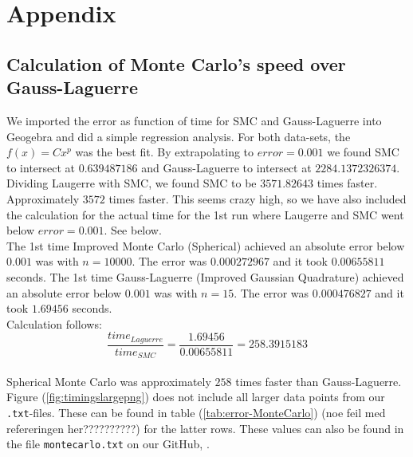 \documentclass{article}
\begin{document}
\section{Appendix} \label{sec:Appendix}

\subsection{Calculation of Monte Carlo's speed over Gauss-Laguerre}
We imported the error as function of time for SMC and Gauss-Laguerre into Geogebra and did a simple regression analysis. For both data-sets, the $f(x)=Cx^p$ was the best fit. By extrapolating to $error=0.001$ we found SMC to intersect at $0.639487186$ and Gauss-Laguerre to intersect at $2284.1372326374$. Dividing Laugerre with SMC, we found SMC to be $3571.82643$ times faster. Approximately $3572$ times faster. This seems crazy high, so we have also included the calculation for the actual time for the 1st run where Laugerre and SMC went below $error=0.001$. See below.\\

The 1st time Improved Monte Carlo (Spherical) achieved an absolute error below $0.001$ was with $n=10000$. The error was $0.000272967$ and it took $0.00655811$ seconds. The 1st time Gauss-Laguerre (Improved Gaussian Quadrature) achieved an absolute error below $0.001$ was with $n=15$. The error was $0.000476827$ and it took $1.69456$ seconds. \\

Calculation follows: \\

$$\frac{time_{Laguerre}}{time_{SMC}} = \frac{1.69456}{0.00655811} = 258.3915183$$ \\

Spherical Monte Carlo was approximately $258$ times faster than Gauss-Laguerre.\\

Figure (\ref{fig:timingslargepng}) does not include all larger data points from our \texttt{.txt}-files. These can be found in table (\ref{tab:error-MonteCarlo}) (noe feil med refereringen her??????????) for the latter rows. These values can also be found in the file \texttt{montecarlo.txt} on our GitHub, \cite{github}.
\end{document}
